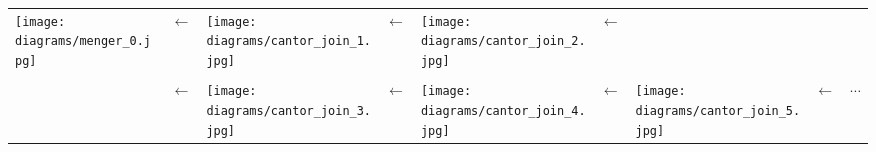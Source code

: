 \documentclass[pdftex, 10pt]{amsart}
\begin{document}
\newcommand{\w}{22mm}
\renewcommand{\w}{22mm}
\begin{longtable}{m{\w}m{2mm}m{\w}m{2mm}m{\w}m{2mm}m{\w}m{2mm}m{2cm}}
	\texttt{[image: diagrams/menger\_0.jpg]} &
	$\leftarrow$ &
	\texttt{[image: diagrams/cantor\_join\_1.jpg]} &
	$\leftarrow$ &
	\texttt{[image: diagrams/cantor\_join\_2.jpg]} &
	$\leftarrow$ &
    &
    &
    \\
	& & & & & & & &
    \\
    &
	$\leftarrow$ &
	\texttt{[image: diagrams/cantor\_join\_3.jpg]} &
	$\leftarrow$ &
	\texttt{[image: diagrams/cantor\_join\_4.jpg]} &
	$\leftarrow$ &
	\texttt{[image: diagrams/cantor\_join\_5.jpg]} &
	$\leftarrow$
	& $\cdots$
\end{longtable}
\end{document}
